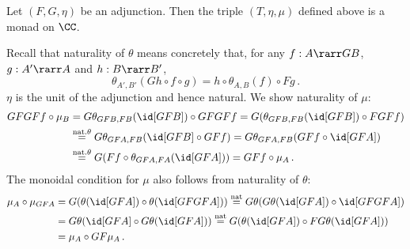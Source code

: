 \documentclass{svmult}
\begin{document}
%
\begin{myproposition}
Let $(F,G,\eta)$ be an adjunction. Then the triple $(T,\eta,\mu)$ defined above is a monad on $\CC$.
\end{myproposition}
\proof
%
Recall that naturality of $\theta$ means concretely that, for any $f:A\rarr GB$, $g:A'\rarr A$ and $h:B\rarr B'$,
\[ \theta_{A',B'}(Gh\circ f\circ g) = h\circ\theta_{A,B}(f)\circ Fg\,. \]
$\eta$ is the unit of the adjunction and hence natural. We show naturality of $\mu$:
\begin{align*}
GFGFf\circ\mu_B &= G\theta_{GFB,FB}(\id[GFB])\circ GFGFf=G(\theta_{GFB,FB}(\id[GFB])\circ FGFf) \\
    &\overset{\text{nat.}\theta}{=} G\theta_{GFA,FB}(\id[GFB]\circ GFf) = G\theta_{GFA,FB}(GFf\circ\id[GFA]) \\
    &\overset{\text{nat.}\theta}{=} G(Ff\circ\theta_{GFA,FA}(\id[GFA])) = GFf\circ\mu_A\,.
\end{align*}
The monoidal condition for $\mu$ also follows from naturality of $\theta$:
\begin{align*}
\mu_A\circ\mu_{GFA} &= G(\theta(\id[GFA])\circ\theta(\id[GFGFA])) \overset{\text{nat}}{=} G\theta(G\theta(\id[GFA])\circ\id[GFGFA]) \\
    &= G\theta(\id[GFA]\circ G\theta(\id[GFA])) \overset{\text{nat}}{=} G(\theta(\id[GFA])\circ FG\theta(\id[GFA])) \\
    &= \mu_A\circ GF\mu_A\,.
\end{align*}
\end{document}
